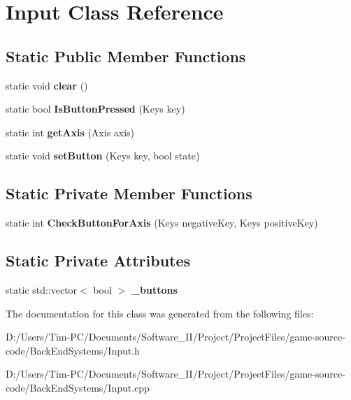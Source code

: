 \hypertarget{class_input}{}\section{Input Class Reference}
\label{class_input}
\subsection*{Static Public Member Functions}
\begin{DoxyCompactItemize}
\item 
\mbox{\label{class_input_a137d26e571405f42b63c955958fd7c92}} 
static void {\bfseries clear} ()
\item 
\mbox{\label{class_input_abb8551549ffe7b1474aca91ce3509d57}} 
static bool {\bfseries Is\+Button\+Pressed} (Keys key)
\item 
\mbox{\label{class_input_a5c4b1c67c7d3e28d4af79601c81ed8bb}} 
static int {\bfseries get\+Axis} (Axis axis)
\item 
\mbox{\label{class_input_a851f7b43b30dcf7166af7c548d21316f}} 
static void {\bfseries set\+Button} (Keys key, bool state)
\end{DoxyCompactItemize}
\subsection*{Static Private Member Functions}
\begin{DoxyCompactItemize}
\item 
\mbox{\label{class_input_a7419956b2d6001cef104b8abdf242477}} 
static int {\bfseries Check\+Button\+For\+Axis} (Keys negative\+Key, Keys positive\+Key)
\end{DoxyCompactItemize}
\subsection*{Static Private Attributes}
\begin{DoxyCompactItemize}
\item 
\mbox{\label{class_input_affef708e1d603d97a7218b64eab063b5}} 
static std\+::vector$<$ bool $>$ {\bfseries \+\_\+buttons}
\end{DoxyCompactItemize}


The documentation for this class was generated from the following files\+:\begin{DoxyCompactItemize}
\item 
D\+:/\+Users/\+Tim-\/\+P\+C/\+Documents/\+Software\+\_\+\+I\+I/\+Project/\+Project\+Files/game-\/source-\/code/\+Back\+End\+Systems/Input.\+h\item 
D\+:/\+Users/\+Tim-\/\+P\+C/\+Documents/\+Software\+\_\+\+I\+I/\+Project/\+Project\+Files/game-\/source-\/code/\+Back\+End\+Systems/Input.\+cpp\end{DoxyCompactItemize}
